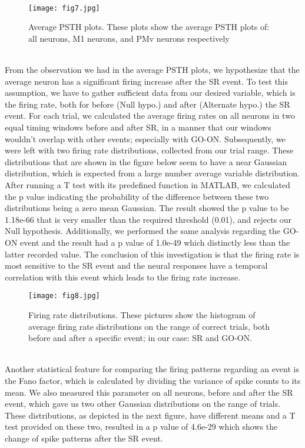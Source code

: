 \documentclass[9pt,twocolumn]{paper-template}
\begin{document}
\\
\begin{SCfigure*}[\sidecaptionrelwidth][t]
\centering
\texttt{[image: fig7.jpg]}
\caption{Average PSTH plots. These plots show the average PSTH plots of: all neurons, M1 neurons, and PMv neurons respectively}\label{fig:side}
\end{SCfigure*}
\\
From the observation we had in the average PSTH plots, we hypothesize that the average neuron has a significant firing increase after the SR event. To test this assumption, we have to gather sufficient data from our desired variable, which is the firing rate, both for before (Null hypo.) and after (Alternate hypo.) the SR event. For each trial, we calculated the average firing rates on all neurons in two equal timing windows before and after SR, in a manner that our windows wouldn’t overlap with other events; especially with GO-ON. Subsequently, we were left with two firing rate distributions, collected from our trial range. These distributions that are shown in the figure below seem to have a near Gaussian distribution, which is expected from a large number average variable distribution. After running a T test with its predefined function in MATLAB, we calculated the p value indicating the probability of the difference between these two distributions being a zero mean Gaussian. The result showed the p value to be 1.18e-66 that is very smaller than the required threshold (0.01), and rejects our Null hypothesis. Additionally, we performed the same analysis regarding the GO-ON event and the result had a p value of 1.0e-49 which distinctly less than the latter recorded value. The conclusion of this investigation is that the firing rate is most sensitive to the SR event and the neural responses have a temporal correlation with this event which leads to the firing rate increase.\\
\begin{figure}%
\centering
\texttt{[image: fig8.jpg]}
\caption{Firing rate distributions. These pictures show the histogram of average firing rate distributions on the range of correct trials, both before and after a specific event; in our case: SR and GO-ON.}
\label{fig:frog}
\end{figure}
\\
Another statistical feature for comparing the firing patterns regarding an event is the Fano factor, which is calculated by dividing the variance of spike counts to its mean. We also measured this parameter on all neurons, before and after the SR event, which gave us two other Gaussian distributions on the range of trials. These distributions, as depicted in the next figure, have different means and a T test provided on these two, resulted in a p value of 4.6e-29 which shows the change of spike patterns after the SR event.
\end{document}
